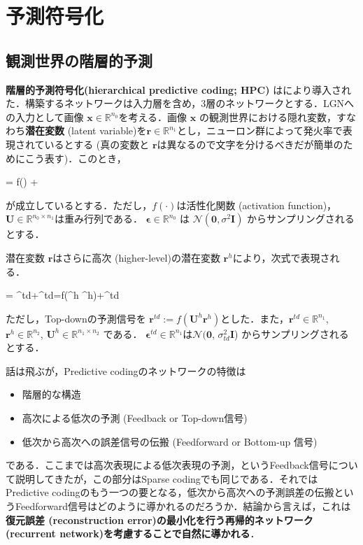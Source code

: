 \section{予測符号化}
\subsection{観測世界の階層的予測}
\textbf{階層的予測符号化(hierarchical predictive coding; HPC)} は\cite{Rao1999-zv}により導入された．構築するネットワークは入力層を含め，3層のネットワークとする．LGNへの入力として画像 $\mathbf{x} \in \mathbb{R}^{n_0}$を考える．画像 $\mathbf{x}$ の観測世界における隠れ変数，すなわち\textbf{潜在変数} (latent variable)を$\mathbf{r} \in \mathbb{R}^{n_1}$とし，ニューロン群によって発火率で表現されているとする (真の変数と $\mathbf{r}$は異なるので文字を分けるべきだが簡単のためにこう表す)．このとき，


 = f() + \boldsymbol{\epsilon}


が成立しているとする．ただし，$f(\cdot)$は活性化関数 (activation function)，$\mathbf{U} \in \mathbb{R}^{n_0 \times n_1}$は重み行列である．
$\boldsymbol{\epsilon} \in \mathbb{R}^{n_0}$ は $\mathcal{N}(\mathbf{0}, \sigma^2 \mathbf{I})$ からサンプリングされるとする．

潜在変数 $\mathbf{r}$はさらに高次 (higher-level)の潜在変数 $\mathbf{r}^h$により，次式で表現される．


 = ^{td}+\boldsymbol{\epsilon}^{td}=f(^h ^h)+\boldsymbol{\epsilon}^{td}


ただし，Top-downの予測信号を $\mathbf{r}^{td}:=f(\mathbf{U}^h \mathbf{r}^h)$とした．また，$\mathbf{r}^{td} \in \mathbb{R}^{n_1}$, $\mathbf{r}^{h} \in \mathbb{R}^{n_2}$, $\mathbf{U}^h \in \mathbb{R}^{n_1 \times n_2}$ である．
$\boldsymbol{\epsilon}^{td} \in \mathbb{R}^{n_1}$は$\mathcal{N}(\mathbf{0}$, $\sigma_{td}^2 \mathbf{I}$) からサンプリングされるとする．

話は飛ぶが，Predictive codingのネットワークの特徴は
\begin{itemize}
\item 階層的な構造
\item 高次による低次の予測 (Feedback or Top-down信号)
\item 低次から高次への誤差信号の伝搬 (Feedforward or Bottom-up 信号)
\end{itemize}

である．ここまでは高次表現による低次表現の予測，というFeedback信号について説明してきたが，この部分はSparse codingでも同じである．それではPredictive codingのもう一つの要となる，低次から高次への予測誤差の伝搬というFeedforward信号はどのように導かれるのだろうか．結論から言えば，これは\textbf{復元誤差 (reconstruction error)の最小化を行う再帰的ネットワーク (recurrent network)を考慮することで自然に導かれる}．

